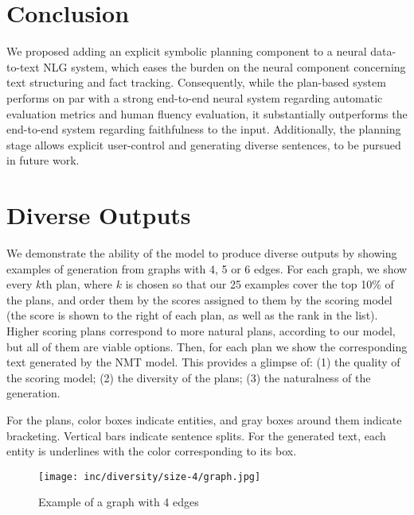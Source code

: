 \documentclass[11pt,a4paper]{article}
\begin{document}
\section{Conclusion}
We proposed adding an explicit symbolic planning component to a neural data-to-text NLG system, which eases the burden on the neural component concerning text structuring and fact tracking. Consequently, while the plan-based system performs on par with a strong end-to-end neural system regarding automatic evaluation metrics and human fluency evaluation, it substantially outperforms the end-to-end system regarding faithfulness to the input. Additionally, the planning stage allows explicit user-control and generating diverse sentences, to be pursued in future work.


\clearpage

\appendix
\appendixpage
\addappheadtotoc
\section{Diverse Outputs}

We demonstrate the ability of the model to produce diverse outputs by showing examples of generation from graphs with 4, 5 or 6 edges. For each graph, we show every $k$th plan, where $k$ is chosen so that our 25 examples cover the top 10\% of the plans, and order them by the scores assigned to them by the scoring model (the score is shown to the right of each plan, as well as the rank in the list). Higher scoring plans correspond to more natural plans, according to our model, but all of them are viable options. Then, for each plan we show the corresponding text generated by the NMT model. This provides a glimpse of: (1) the quality of the scoring model; (2) the diversity of the plans; (3) the naturalness of the generation.

For the plans, color boxes indicate entities, and gray boxes around them indicate bracketing. Vertical bars indicate sentence splits.
For the generated text, each entity is underlines with the color corresponding to its box.







\begin{figure*}[!hb]
    \centering
    \texttt{[image: inc/diversity/size-4/graph.jpg]}
    \caption{Example of a graph with 4 edges}
    \label{fig:diversity:size-4:graph}
\end{figure*}
\end{document}

